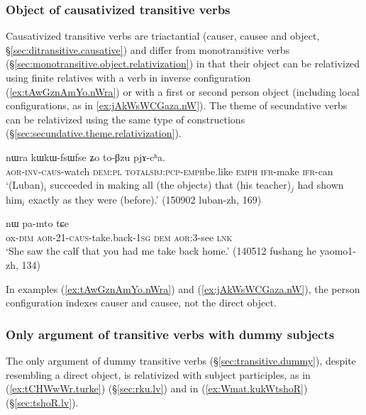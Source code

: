 \subsubsection{Object of causativized transitive verbs} \label{sec:object.causative.relativization}
Causativized transitive verbs are triactantial (causer, causee and object, §\ref{sec:ditransitive.causative}) and differ from monotransitive verbs (§\ref{sec:monotransitive.object.relativization}) in that their object can be relativized using finite relatives with a verb in inverse configuration (\ref{ex:tAwGznAmYo.nWra}) or with a first or second person object (including local configurations, as in \ref{ex:jAkWsWCGaza.nW}). The theme of secundative verbs can be relativized using the same type of constructions (§\ref{sec:secundative.theme.relativization}).

\begin{exe}
\ex \label{ex:tAwGznAmYo.nWra}
\gll [tɤ́-wɣ-z-nɤmɲo] nɯra kɯ\redp{}kɯ-fsɯ\redp{}fse ʑo to-βzu pjɤ-cʰa.   \\
\textsc{aor}-\textsc{inv}-\textsc{caus}-watch \textsc{dem}:\textsc{pl} \textsc{total}\redp{}\textsc{sbj}:\textsc{pcp}-\textsc{emph}\redp{}be.like \textsc{emph} \textsc{ifr}-make \textsc{ifr}-can \\
\glt `(Luban)$_i$ succeeded in making all (the objects) that (his teacher)$_j$ had shown him$_i$ exactly as they were (before).' (150902 luban-zh, 169)
\end{exe} 
 
\begin{exe}
\ex \label{ex:jAkWsWCGaza.nW}
 nɯ pa-mto tɕe \\
ox-\textsc{dim} \textsc{aor}-2\fl{}1-\textsc{caus}-take.back-\textsc{1sg} \textsc{dem} \textsc{aor}:3\flobv{}-see \textsc{lnk} \\
\glt `She saw the calf that you had me take back home.' (140512 fushang he yaomo1-zh, 134)
\end{exe} 

In examples (\ref{ex:tAwGznAmYo.nWra}) and (\ref{ex:jAkWsWCGaza.nW}), the person configuration indexes causer and causee, not the direct object. 

\subsubsection{Only argument of transitive verbs with dummy subjects}  \label{sec:dummy.subj.object.relativization}
The only argument of dummy transitive verbs (§\ref{sec:transitive.dummy}), despite resembling a direct object, is relativized with subject participles, as  in (\ref{ex:tCHWwWr.turke}) (§\ref{sec:rku.lv}) and  in (\ref{ex:Wmat.kukWtshoR}) (§\ref{sec:tshoR.lv}). 


